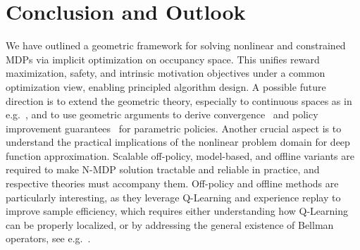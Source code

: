 \documentclass{article}
\theoremstyle{plain}
\theoremstyle{definition}
\theoremstyle{remark}
\begin{document}

\section{Conclusion and Outlook}
We have outlined a geometric framework for solving nonlinear and constrained MDPs via implicit optimization on occupancy space. This unifies reward maximization, safety, and intrinsic motivation objectives under a common optimization view, enabling principled algorithm design.
A possible future direction is to extend the geometric theory, especially to continuous spaces as in e.g.~\citep{ay2017information, aubin2022mirror},
and to use geometric arguments to derive convergence~\citep{muller2023geometry} and policy improvement guarantees~\citep{schulman2017trust} for parametric policies. 
Another crucial aspect is to understand the practical implications of the nonlinear problem domain for deep function approximation. 
Scalable off-policy, model-based, and offline variants are required to make N-MDP solution tractable and reliable in practice, and respective theories must accompany them. 
Off-policy and offline methods are particularly interesting, as they leverage Q-Learning and experience replay to improve sample efficiency, which requires either understanding how Q-Learning can be properly localized, or by addressing the general existence of Bellman operators, see e.g.~\citep{neu2017unified, geist2019theory}.
\end{document}
